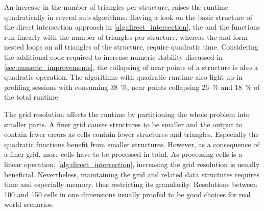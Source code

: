 An increase in the number of triangles per structure, raises the runtime quadratically in several sub-algorithms.
Having a look on the basic structure of the direct intersection approach in \cref{alg:direct_intersection}, the  and the  functions run linearly with the number of triangles per structure, whereas the  and  form nested loops on all triangles of the structure, \ie require quadratic time.
Considering the additional code required to increase numeric stability discussed in \cref{sec:numeric_improvements}, the collapsing of near points of a structure is also a quadratic operation.
The algorithms with quadratic runtime also light up in profiling sessions with  consuming \SI{38}{\percent}, near points collapsing \SI{26}{\percent} and  \SI{18}{\percent} of the total runtime.

The grid resolution affects the runtime by partitioning the whole problem into smaller parts.
A finer grid causes structures to be smaller and the output to contain fewer errors as cells contain fewer structures and triangles.
Especially the quadratic functions benefit from smaller structures.
However, as a consequence of a finer grid, more cells have to be processed in total.
As processing cells is a linear operation, \cf \cref{alg:direct_intersection}, increasing the grid resolution is usually beneficial.
Nevertheless, maintaining the grid and related data structures requires time and especially memory, thus restricting its granularity.
Resolutions between 100 and 150 cells in one dimensions usually proofed to be good choices for real world scenarios.


